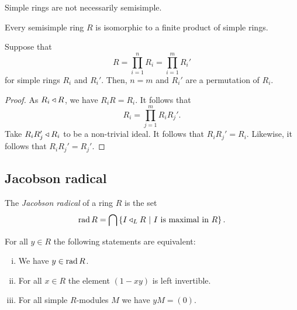 \begin{opomba}
Simple rings are not necessarily semisimple.
\end{opomba}

\begin{opomba}
Every semisimple ring $R$ is isomorphic to a finite product of
simple rings.
\end{opomba}

\begin{trditev}
Suppose that
\[
R = \prod_{i=1}^n R_i = \prod_{i=1}^m R_i'
\]
for simple rings $R_i$ and $R_i'$. Then, $n = m$ and $R_i'$ are a
permutation of $R_i$.
\end{trditev}

\begin{proof}
As $R_i \triangleleft R$, we have $R_i R = R_i$. It follows that
\[
R_i = \prod_{j=1}^m R_i R_j'.
\]
Take $R_i R_j' \triangleleft R_i$ to be a non-trivial ideal. It follows that
$R_i R_j' = R_i$. Likewise, it follows that $R_i R_j' = R_j'$.
\end{proof}

\newpage

\subsection{Jacobson radical}

\begin{definicija}
The \emph{Jacobson radical} of a ring $R$
is the set
\[
\operatorname{rad} R = \bigcap \left\{I \triangleleft_L R~\middle\vert~\text{$I$ is maximal in $R$}\right\}.
\]
\end{definicija}

\begin{lema}
\label{fin_dim_alg:lm:jac_rad}
For all $y \in R$ the following statements are equivalent:

\begin{enumerate}[i)]
\item We have $y \in \operatorname{rad} R$.
\item For all $x \in R$ the element $(1-xy)$ is left invertible.
\item For all simple $R$-modules $M$ we have $yM = (0)$.
\end{enumerate}
\end{lema}

